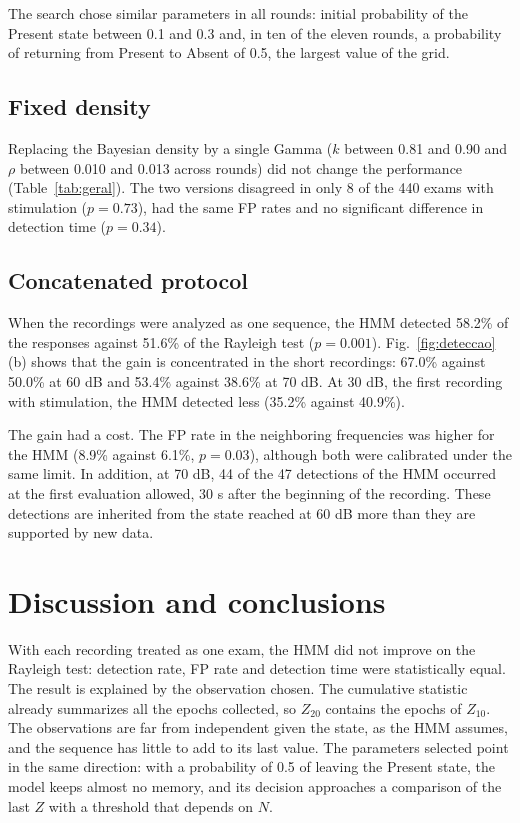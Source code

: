 \documentclass[conference]{IEEEtran}
\begin{document}
The search chose similar parameters in all rounds: initial probability of the Present state between 0.1 and 0.3 and, in ten of the eleven rounds, a probability of returning from Present to Absent of 0.5, the largest value of the grid.

\subsection{Fixed density}

Replacing the Bayesian density by a single Gamma ($k$ between 0.81 and 0.90 and $\rho$ between 0.010 and 0.013 across rounds) did not change the performance (Table~\ref{tab:geral}). The two versions disagreed in only 8 of the 440 exams with stimulation ($p=0.73$), had the same FP rates and no significant difference in detection time ($p=0.34$).

\subsection{Concatenated protocol}

When the recordings were analyzed as one sequence, the HMM detected 58.2\% of the responses against 51.6\% of the Rayleigh test ($p=0.001$). Fig.~\ref{fig:deteccao}(b) shows that the gain is concentrated in the short recordings: 67.0\% against 50.0\% at 60 dB and 53.4\% against 38.6\% at 70 dB. At 30 dB, the first recording with stimulation, the HMM detected less (35.2\% against 40.9\%).

The gain had a cost. The FP rate in the neighboring frequencies was higher for the HMM (8.9\% against 6.1\%, $p=0.03$), although both were calibrated under the same limit. In addition, at 70 dB, 44 of the 47 detections of the HMM occurred at the first evaluation allowed, 30 s after the beginning of the recording. These detections are inherited from the state reached at 60 dB more than they are supported by new data.

\section{Discussion and conclusions}

With each recording treated as one exam, the HMM did not improve on the Rayleigh test: detection rate, FP rate and detection time were statistically equal. The result is explained by the observation chosen. The cumulative statistic already summarizes all the epochs collected, so $Z_{20}$ contains the epochs of $Z_{10}$. The observations are far from independent given the state, as the HMM assumes, and the sequence has little to add to its last value. The parameters selected point in the same direction: with a probability of 0.5 of leaving the Present state, the model keeps almost no memory, and its decision approaches a comparison of the last $Z$ with a threshold that depends on $N$.
\end{document}
